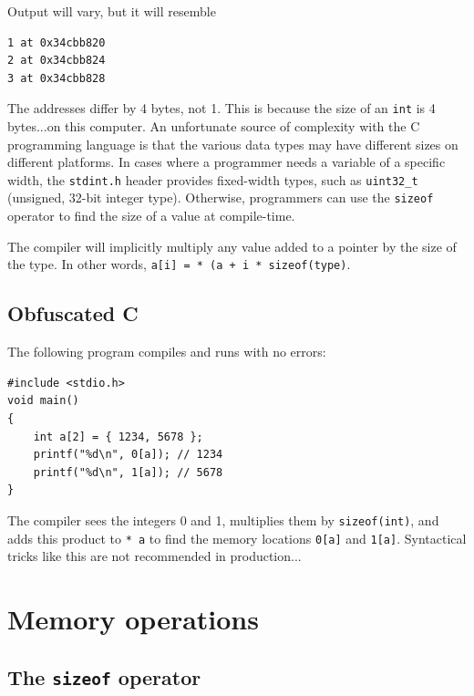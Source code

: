 \documentclass{book}
\begin{document}
Output will vary, but it will resemble

\begin{lstlisting}[caption={todo}, captionpos=b, mathescape, xleftmargin=.25in, xrightmargin=.25in]
1 at 0x34cbb820                          
2 at 0x34cbb824                          
3 at 0x34cbb828
\end{lstlisting}

The addresses differ by 4 bytes, not 1. This is because the size of an \texttt{int} is 4 bytes...on this computer. An unfortunate source of complexity with the C programming language is that the various data types may have different sizes on different platforms. In cases where a programmer needs a variable of a specific width, the \texttt{stdint.h} header provides fixed-width types, such as \texttt{uint32\_t} (unsigned, 32-bit integer type). Otherwise, programmers can use the \texttt{sizeof} operator to find the size of a value at compile-time.

The compiler will implicitly multiply any value added to a pointer by the size of the type. In other words, \texttt{a[i] = * (a + i * sizeof(type)}.

\subsection{Obfuscated C}

The following program compiles and runs with no errors:

\begin{lstlisting}[caption={todo}, captionpos=b, mathescape, xleftmargin=.25in, xrightmargin=.25in]
#include <stdio.h>
void main()
{
    int a[2] = { 1234, 5678 };
    printf("%d\n", 0[a]); // 1234
    printf("%d\n", 1[a]); // 5678
}
\end{lstlisting}

The compiler sees the integers 0 and 1, multiplies them by \texttt{sizeof(int)}, and adds this product to \texttt{* a} to find the memory locations \texttt{0[a]} and \texttt{1[a]}. Syntactical tricks like this are not recommended in production...

\section{Memory operations}

\subsection{The \texttt{sizeof} operator}
\end{document}
